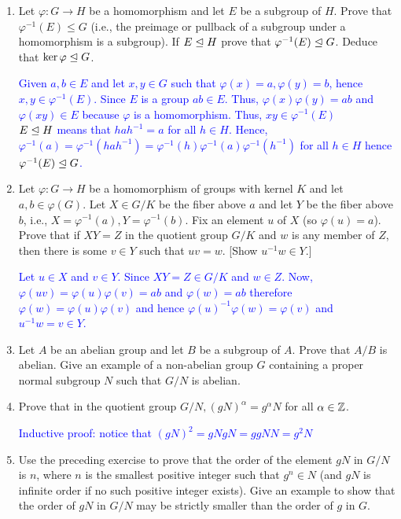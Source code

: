 \documentclass[10pt,a4paper]{report}
\newcommand{\BLUE}[1]{\textcolor{blue}{#1}}
\begin{document}
\begin{enumerate}
	\item Let $\varphi: G\to H$ be a homomorphism and let $E$ be a subgroup of $H$.  Prove that $\varphi^{-1}(E)\le G$ (i.e., the preimage or pullback of a subgroup under a homomorphism is a subgroup).  If $E \trianglelefteq H$ prove that $\varphi^{-1}(E) \trianglelefteq G$.  Deduce that $\text{ker}\,\varphi \trianglelefteq G$.
	
	\BLUE{Given $a,b \in E$ and let $x,y \in G$ such that $\varphi(x)=a, \varphi(y)=b$, hence $x,y \in \varphi^{-1}(E)$.  Since $E$ is a group $ab \in E$.  Thus, $\varphi(x)\varphi(y) = ab$ and $\varphi(xy) \in E$ because $\varphi$ is a homomorphism. Thus, $xy \in \varphi^{-1}(E)$\\
	$E \trianglelefteq H$ means that $hah^{-1}=a$ for all $h \in H$.  Hence, $\varphi^{-1}(a)=\varphi^{-1}(hah^{-1})=\varphi^{-1}(h)\varphi^{-1}(a)\varphi^{-1}(h^{-1})$ for all $h \in H$ hence $\varphi^{-1}(E) \trianglelefteq G$.
	}
	
	\item Let $\varphi : G \to H$ be a homomorphism of groups with kernel $K$ and let $a,b \in \varphi(G)$.  Let $X \in G/K$ be the fiber above $a$ and let $Y$ be the fiber above $b$, i.e., $X=\varphi^{-1}(a), Y=\varphi^{-1}(b)$. Fix an element $u$ of $X$ (so $\varphi(u)=a$).  Prove that if $XY=Z$ in the quotient group $G/K$ and $w$ is any member of $Z$, then there is some $v \in Y$ such that $uv=w$. [Show $u^{-1}w \in Y$.]
	
	\BLUE{Let $u \in X$ and $v \in Y$.  Since $XY=Z \in G/K$ and $w \in Z$.  Now, $\varphi(uv)=\varphi(u)\varphi(v)=ab$ and $\varphi(w)=ab$ therefore $\varphi(w)=\varphi(u)\varphi(v)$ and hence $\varphi(u)^{-1}\varphi(w)=\varphi(v)$ and $u^{-1}w = v \in Y$.
	}
	
	\item Let $A$ be an abelian group and let $B$ be a subgroup of $A$.  Prove that $A/B$ is abelian.  Give an example of a non-abelian group $G$ containing a proper normal subgroup $N$ such that $G/N$ is abelian.
	
	\item Prove that in the quotient group $G/N, (gN)^\alpha=g^\alpha N$ for all $\alpha \in \mathbb{Z}$.
	
	\BLUE{Inductive proof:  notice that $(gN)^2=gNgN=ggNN=g^2N$}
	
	\item Use the preceding exercise to prove that the order of the element $gN$ in $G/N$ is $n$, where $n$ is the smallest positive integer such that $g^n \in N$ (and $gN$ is infinite order if no such positive integer exists).  Give an example to show that the order of $gN$ in $G/N$ may be strictly smaller than the order of $g$ in $G$.
	

\end{enumerate}
\end{document}
